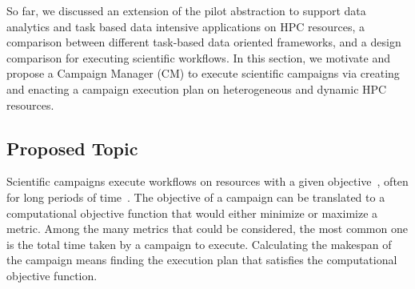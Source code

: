 \label{research}
So far, we discussed an extension of the pilot abstraction to support data analytics and task based data intensive applications on HPC resources, a comparison between different task-based data oriented frameworks, and a design comparison for executing scientific workflows.
In this section, we motivate and propose a Campaign Manager (CM) to execute scientific campaigns via creating and enacting a campaign execution plan on heterogeneous and dynamic HPC resources. 

\subsection{Proposed Topic}
Scientific campaigns execute workflows on resources with a given objective~\cite{casajus2010dirac}, often for long periods of time~\cite{maeno2008panda}.
The objective of a campaign can be translated to a computational objective function that would either minimize or maximize a metric. Among the many metrics that could be considered, the most common one is the total time taken by a campaign to execute. 
Calculating the makespan of the campaign means finding the execution plan that satisfies the computational objective function.



